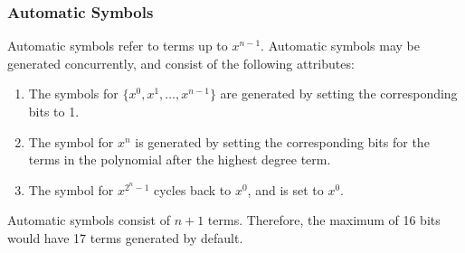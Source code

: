 \documentclass[11pt]{extarticle}
\begin{document}
            \subsubsection{Automatic Symbols}

            Automatic symbols refer to terms up to $x^{n-1}$. Automatic symbols
            may be generated concurrently, and consist of the following
            attributes:
            \begin{enumerate}
                \item The symbols for $\{x^{0}, x^{1}, \ldots, x^{n-1}\}$ are
                generated by setting the corresponding bits to 1.
                \item The symbol for $x^{n}$ is generated by setting the
                corresponding bits for the terms in the polynomial after the
                highest degree term.
                \item The symbol for $x^{2^{n}-1}$ cycles back to $x^{0}$, and
                is set to $x^{0}$.
            \end{enumerate}

                Automatic symbols consist of $n+1$ terms. Therefore, the
                maximum of 16 bits would have 17 terms generated by default.
\end{document}
